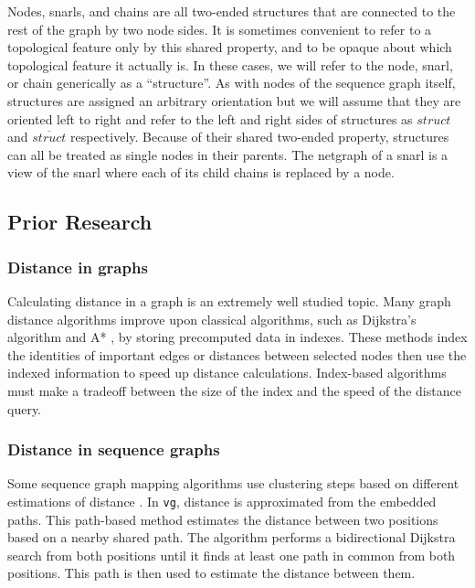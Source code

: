 \documentclass[11pt]{ucscthesis}
\begin{document}
Nodes, snarls, and chains are all two-ended structures that are connected to the rest of the graph by two node sides.
It is sometimes convenient to refer to a topological feature only by this shared property, and to be opaque about which topological feature it actually is.
In these cases, we will refer to the node, snarl, or chain generically as a ``structure''.
As with nodes of the sequence graph itself, structures are assigned an arbitrary orientation but we will assume that they are oriented left to right and refer to the left and right sides of structures as $struct$ and $\overline{struct}$ respectively.
Because of their shared two-ended property, structures can all be treated as single nodes in their parents.
The netgraph of a snarl is a view of the snarl where each of its child chains is replaced by a node.



\subsection{Prior Research}

\subsubsection{Distance in graphs}

Calculating distance in a graph is an extremely well studied topic.
Many graph distance algorithms improve upon classical algorithms, such as Dijkstra's algorithm \cite{dijkstra_note_1959} and A* \cite{hart_formal_1968}, by storing precomputed data in indexes.
These methods index the identities of important edges \cite{hutchison_partitioning_2005,lauther_extremely_2004} or distances between selected nodes \cite{dave_topcom:_2015,qiao_approximate_2012,goos_efficient_1997,akiba_fast_2013-1} then use the indexed information to speed up distance calculations.
Index-based algorithms must make a tradeoff between the size of the index and the speed of the distance query.

\subsubsection{Distance in sequence graphs}

Some sequence graph mapping algorithms use clustering steps based on different estimations of distance \cite{vaddadi_read_2019,garrison_variation_2018}. 
In \texttt{vg}, distance is approximated from the embedded paths.
This path-based method estimates the distance between two positions based on a nearby shared path.
The algorithm performs a bidirectional Dijkstra search from both positions until it finds at least one path in common from both positions.
This path is then used to estimate the distance between them. 
\end{document}
